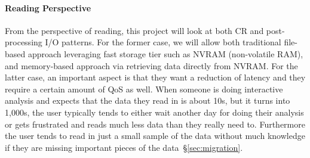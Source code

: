 \paragraph{Reading  Perspective}
\label{subsec:reading-perspective}
From the perspective of reading, this project will look at both
CR  and post-processing I/O patterns. For the former case,
we will allow both traditional file-based approach leveraging fast storage tier
such as NVRAM (non-volatile RAM), and memory-based approach via retrieving
data directly from NVRAM. For the latter case,
an important aspect is that they want a reduction of latency and they
require a certain amount of QoS as well. When someone is
doing interactive analysis and expects that the data they read in is about
10s, but it turns into 1,000s, the user typically tends to either wait
another day for doing their analysis or gets frustrated and reads much less
data than they really need to. Furthermore the user tends to read in just a
small sample of the data without much knowledge if they are missing
important pieces of the data~\S\ref{sec:migration}.



